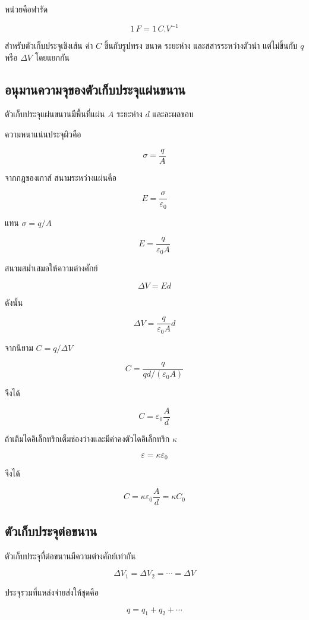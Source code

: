 หน่วยคือฟารัด

\[
1\,\si{F}=1\,\si{C.V^{-1}}
\]

สำหรับตัวเก็บประจุเชิงเส้น ค่า $C$ ขึ้นกับรูปทรง ขนาด ระยะห่าง และสสารระหว่างตัวนำ แต่ไม่ขึ้นกับ $q$ หรือ $\Delta V$ โดยแยกกัน

\subsection{อนุมานความจุของตัวเก็บประจุแผ่นขนาน}

ตัวเก็บประจุแผ่นขนานมีพื้นที่แผ่น $A$ ระยะห่าง $d$ และละผลขอบ

ความหนาแน่นประจุผิวคือ

\[
\sigma=\frac{q}{A}
\]

จากกฎของเกาส์ สนามระหว่างแผ่นคือ

\[
E=\frac{\sigma}{\varepsilon_0}
\]

แทน $\sigma=q/A$

\[
E=\frac{q}{\varepsilon_0A}
\]

สนามสม่ำเสมอให้ความต่างศักย์

\[
\Delta V=Ed
\]

ดังนั้น

\[
\Delta V=\frac{q}{\varepsilon_0A}d
\]

จากนิยาม $C=q/\Delta V$

\[
C=\frac{q}{qd/(\varepsilon_0A)}
\]

จึงได้

\begin{tcolorbox}[title={ตัวเก็บประจุแผ่นขนาน}]
\[
\boxed{C=\varepsilon_0\frac{A}{d}}
\]
\end{tcolorbox}

ถ้าเติมไดอิเล็กทริกเต็มช่องว่างและมีค่าคงตัวไดอิเล็กทริก $\kappa$

\[
\varepsilon=\kappa\varepsilon_0
\]

จึงได้

\[
\boxed{C=\kappa\varepsilon_0\frac{A}{d}=\kappa C_0}
\]

\subsection{ตัวเก็บประจุต่อขนาน}

ตัวเก็บประจุที่ต่อขนานมีความต่างศักย์เท่ากัน

\[
\Delta V_1=\Delta V_2=\cdots=\Delta V
\]

ประจุรวมที่แหล่งจ่ายส่งให้ชุดคือ

\[
q=q_1+q_2+\cdots
\]

